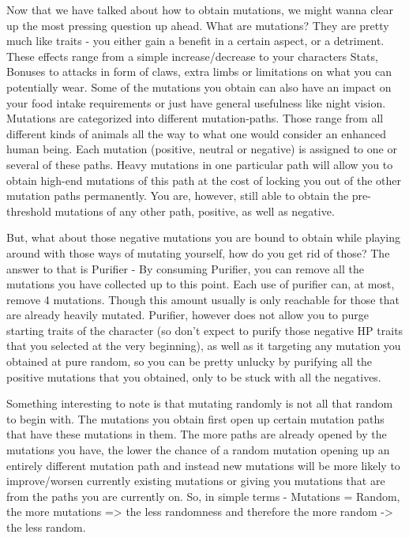 Now that we have talked about how to obtain mutations, we might wanna clear up the most pressing question up ahead. What are mutations?
They are pretty much like traits - you either gain a benefit in a certain aspect, or a detriment. These effects range from a simple increase/decrease to your characters Stats, Bonuses to attacks in form of claws, extra limbs or limitations on what you can potentially wear. Some of the mutations you obtain can also have an impact on your food intake requirements or just have general usefulness like night vision. Mutations are categorized into different mutation-paths. Those range from all different kinds of animals all the way to what one would consider an enhanced human being. Each mutation (positive, neutral or negative) is assigned to one or several of these paths. Heavy mutations in one particular path will allow you to obtain high-end mutations of this path at the cost of locking you out of the other mutation paths permanently. You are, however, still able to obtain the pre-threshold mutations of any other path, positive, as well as negative.

But, what about those negative mutations you are bound to obtain while playing around with those ways of mutating yourself, how do you get rid of those? The answer to that is Purifier - By consuming Purifier, you can remove all the mutations you have collected up to this point. Each use of purifier can, at most, remove 4 mutations. Though this amount usually is only reachable for those that are already heavily mutated. Purifier, however does not allow you to purge starting traits of the character (so don't expect to purify those negative HP traits that you selected at the very beginning), as well as it targeting any mutation you obtained at pure random, so you can be pretty unlucky by purifying all the positive mutations that you obtained, only to be stuck with all the negatives.

Something interesting to note is that mutating randomly is not all that random to begin with. The mutations you obtain first open up certain mutation paths that have these mutations in them. The more paths are already opened by the mutations you have, the lower the chance of a random mutation opening up an entirely different mutation path and instead new mutations will be more likely to improve/worsen currently existing mutations or giving you mutations that are from the paths you are currently on. So, in simple terms - Mutations = Random, the more mutations => the less randomness and therefore the more random -> the less random.

